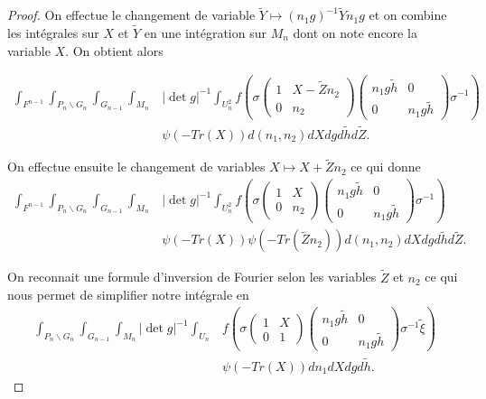 \documentclass{amsart}
\begin{document}
\begin{proof}
On effectue le changement de variable $\tilde{Y} \mapsto (n_1g)^{-1}\tilde{Y} n_1 g$ et on combine les intégrales sur $X$ et $\tilde{Y}$ en une intégration sur $M_n$ dont on note encore la variable $X$. On obtient alors

\begin{equation}
\label{combX}
\begin{split}
\int_{F^{n-1}} \int_{P_n \backslash{G_n}} \int_{G_{n-1}} \int_{M_n}  & |\det g|^{-1}\int_{U_n^2} f\left(\sigma \begin{pmatrix}
1 & X - \tilde{Z}n_2\\
0 & n_2
\end{pmatrix} \begin{pmatrix}
n_1g\tilde{h} & 0 \\
0 & n_1g\tilde{h}
\end{pmatrix} \sigma^{-1} \right) \\
& \psi(-Tr(X)) d(n_1,n_2) dX dg d\tilde{h} d\tilde{Z}.
\end{split}
\end{equation}


On effectue ensuite le changement de variables $X \mapsto X + \tilde{Z}n_2$ ce qui donne
\begin{equation}
\begin{split}
\int_{F^{n-1}} \int_{P_n \backslash{G_n}} \int_{G_{n-1}} \int_{M_n}  & |\det g|^{-1}\int_{U_n^2} f\left(\sigma \begin{pmatrix}
1 & X \\
0 & n_2
\end{pmatrix} \begin{pmatrix}
n_1g\tilde{h} & 0 \\
0 & n_1g\tilde{h}
\end{pmatrix} \sigma^{-1} \right) \\
& \psi(-Tr(X))  \psi(-Tr(\tilde{Z}n_2)) d(n_1,n_2) dX dg d\tilde{h} d\tilde{Z}.
\end{split}
\end{equation}

On reconnait une formule d'inversion de Fourier selon les variables $\tilde{Z}$ et $n_2$ ce qui nous permet de simplifier notre intégrale en
\begin{equation}
\label{combg}
\begin{split}
\int_{P_n \backslash{G_n}} \int_{G_{n-1}} \int_{M_n}  |\det g|^{-1}\int_{U_n} & f\left(\sigma \begin{pmatrix}
1 & X \\
0 & 1
\end{pmatrix} \begin{pmatrix}
n_1g\tilde{h} & 0 \\
0 & n_1g\tilde{h}
\end{pmatrix} \sigma^{-1} \tilde{\xi}\right) \\
& \psi(-Tr(X))  dn_1 dX dg d\tilde{h}.
\end{split}
\end{equation}


\end{proof}
\end{document}
